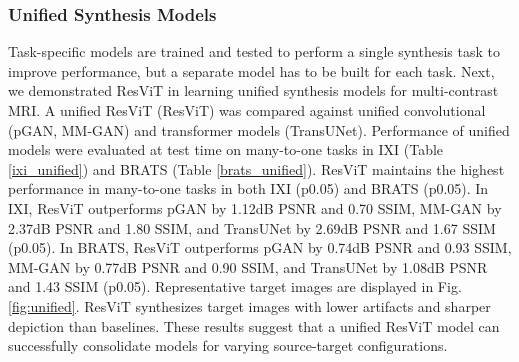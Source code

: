 \documentclass[journal,twoside,web]{ieeecolor}
\begin{document}
\subsubsection{Unified Synthesis Models}
Task-specific models are trained and tested to perform a single synthesis task to improve performance, but a separate model has to be built for each task. Next, we demonstrated ResViT in learning unified synthesis models for multi-contrast MRI. A unified ResViT (ResViT) was compared against unified convolutional (pGAN, MM-GAN) and transformer models (TransUNet). Performance of unified models were evaluated at test time on many-to-one tasks in IXI (Table \ref{ixi_unified}) and BRATS (Table \ref{brats_unified}). ResViT maintains the highest performance in many-to-one tasks in both IXI (p0.05) and BRATS (p0.05). In IXI, ResViT outperforms pGAN by 1.12dB PSNR and 0.70 SSIM, MM-GAN by 2.37dB PSNR and 1.80 SSIM, and TransUNet by 2.69dB PSNR and 1.67 SSIM (p0.05). In BRATS, ResViT outperforms pGAN by 0.74dB PSNR and 0.93 SSIM,  MM-GAN by 0.77dB PSNR and 0.90 SSIM, and TransUNet by 1.08dB PSNR and 1.43 SSIM (p0.05). Representative target images are displayed in Fig. \ref{fig:unified}. ResViT synthesizes target images with lower artifacts and sharper depiction than baselines. These results suggest that a unified ResViT model can successfully consolidate models for varying source-target configurations.
\end{document}
